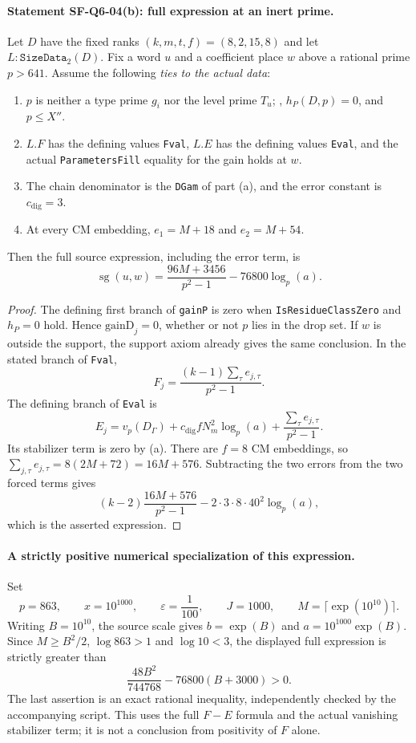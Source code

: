 \documentclass[11pt,a4paper]{article}
\theoremstyle{definition}
\theoremstyle{remark}
\begin{document}
\paragraph{Statement SF-Q6-04(b): full expression at an inert prime.}
Let $D$ have the fixed ranks $(k,m,t,f)=(8,2,15,8)$ and let
$L:\texttt{SizeData}_2(D)$.  Fix a word $u$ and a coefficient
place $w$ above a rational prime $p>641$.  Assume the following
\emph{ties to the actual data}:
\begin{enumerate}
\item $p$ is neither a type prime $g_i$ nor the level prime $T_u$;
      , $h_P(D,p)=0$, and
      $p\le X''$.
\item $L.F$ has the defining values \texttt{Fval}, $L.E$ has the
      defining values \texttt{Eval}, and the actual
      \texttt{ParametersFill} equality for the gain holds at $w$.
\item The chain denominator is the \texttt{DGam} of part (a),
      and the error constant is $c_{\mathrm{dig}}=3$.
\item At every CM embedding,
      $e_1=M+18$ and $e_2=M+54$.
\end{enumerate}
Then the full source expression, including the error term, is
\[
 \boxed{\quad
 \operatorname{sg}(u,w)
   =\frac{96M+3456}{p^2-1}
       -76800\log_p(a).
 \quad}
\]

\begin{proof}
The defining first branch of \texttt{gainP} is zero when
\texttt{IsResidueClassZero} and $h_P=0$ hold.  Hence
$\mathrm{gainD}_j=0$, whether or not $p$ lies in the drop set.
If $w$ is outside the support, the support axiom already gives
the same conclusion.  In the stated branch of \texttt{Fval},
\[
 F_j=\frac{(k-1)\sum_\tau e_{j,\tau}}{p^2-1}.
\]
The defining branch of \texttt{Eval} is
\[
 E_j=v_p(D_\Gamma)
       +c_{\mathrm{dig}}fN_m^2\log_p(a)
       +\frac{\sum_\tau e_{j,\tau}}{p^2-1}.
\]
Its stabilizer term is zero by (a).  There are $f=8$ CM
embeddings, so
$\sum_{j,\tau}e_{j,\tau}=8(2M+72)=16M+576$.
Subtracting the two errors from the two forced terms gives
\[
 (k-2)\frac{16M+576}{p^2-1}
       -2\cdot3\cdot8\cdot40^2\log_p(a),
\]
which is the asserted expression.
\end{proof}

\paragraph{A strictly positive numerical specialization of this expression.}
Set
\[
 p=863,\qquad x=10^{1000},\qquad
 \varepsilon=\frac1{100},\qquad J=1000,\qquad
 M=\lceil\exp(10^{10})\rceil.
\]
Writing $B=10^{10}$, the source scale gives
$b=\exp(B)$ and $a=10^{1000}\exp(B)$.
Since $M\ge B^2/2$, $\log 863>1$ and $\log10<3$, the displayed
full expression is strictly greater than
\[
 \frac{48B^2}{744768}-76800(B+3000)>0.
\]
The last assertion is an exact rational inequality, independently
checked by the accompanying script.  This uses the full
$F-E$ formula and the actual vanishing stabilizer term; it is not
a conclusion from positivity of $F$ alone.
\end{document}
